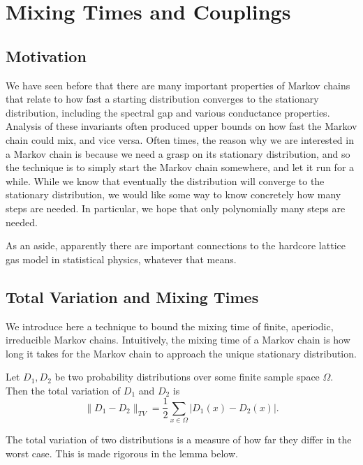 \section{Mixing Times and Couplings}
\subsection{Motivation}
We have seen before that there are many important properties of Markov chains that relate to how fast a starting distribution converges to the stationary distribution, including the spectral gap and various conductance properties. Analysis of these invariants often produced upper bounds on how fast the Markov chain could mix, and vice versa. Often times, the reason why we are interested in a Markov chain is because we need a grasp on its stationary distribution, and so the technique is to simply start the Markov chain somewhere, and let it run for a while. While we know that eventually the distribution will converge to the stationary distribution, we would like some way to know concretely how many steps are needed. In particular, we hope that only polynomially many steps are needed.

As an aside, apparently there are important connections to the hardcore lattice gas model in statistical physics, whatever that means.

\subsection{Total Variation and Mixing Times}
We introduce here a technique to bound the mixing time of finite, aperiodic, irreducible Markov chains. Intuitively, the mixing time of a Markov chain is how long it takes for the Markov chain to approach the unique stationary distribution.
\begin{definition}
Let $D_1, D_2$ be two probability distributions over some finite sample space $\Omega$. Then the total variation of $D_1$ and $D_2$ is
\[\| D_1 - D_2 \|_{TV} = \frac{1}{2} \sum_{x \in \Omega} |D_1 (x) - D_2 (x)|.\]
\end{definition}

The total variation of two distributions is a measure of how far they differ in the worst case. This is made rigorous in the lemma below.

